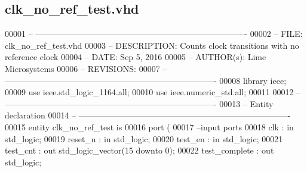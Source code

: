 \subsection{clk\+\_\+no\+\_\+ref\+\_\+test.\+vhd}
\label{clk__no__ref__test_8vhd_source}

\begin{DoxyCode}
00001 \textcolor{keyword}{-- ---------------------------------------------------------------------------- }
00002 \textcolor{keyword}{-- FILE:    clk\_no\_ref\_test.vhd}
00003 \textcolor{keyword}{-- DESCRIPTION: Counts clock transitions with no reference clock}
00004 \textcolor{keyword}{-- DATE:    Sep 5, 2016}
00005 \textcolor{keyword}{-- AUTHOR(s):   Lime Microsystems}
00006 \textcolor{keyword}{-- REVISIONS:}
00007 \textcolor{keyword}{-- ---------------------------------------------------------------------------- }
00008 \textcolor{vhdlkeyword}{library }\textcolor{keywordflow}{ieee};
00009 \textcolor{vhdlkeyword}{use }ieee.std\_logic\_1164.\textcolor{keywordflow}{all};
00010 \textcolor{vhdlkeyword}{use }ieee.numeric\_std.\textcolor{keywordflow}{all};
00011 
00012 \textcolor{keyword}{-- ----------------------------------------------------------------------------}
00013 \textcolor{keyword}{-- Entity declaration}
00014 \textcolor{keyword}{-- ----------------------------------------------------------------------------}
00015 \textcolor{keywordflow}{entity }clk_no_ref_test \textcolor{keywordflow}{is}
00016   \textcolor{keywordflow}{port} \textcolor{vhdlchar}{(}
00017 \textcolor{keyword}{        --input ports }
00018         \textcolor{vhdlchar}{clk}             \textcolor{vhdlchar}{:} \textcolor{keywordflow}{in} \textcolor{comment}{std\_logic};
00019         \textcolor{vhdlchar}{reset_n}         \textcolor{vhdlchar}{:} \textcolor{keywordflow}{in} \textcolor{comment}{std\_logic};
00020           \textcolor{vhdlchar}{test_en}           \textcolor{vhdlchar}{:} \textcolor{keywordflow}{in} \textcolor{comment}{std\_logic};
00021           \textcolor{vhdlchar}{test_cnt}          \textcolor{vhdlchar}{:} \textcolor{keywordflow}{out} \textcolor{comment}{std\_logic\_vector}\textcolor{vhdlchar}{(}\textcolor{vhdllogic}{}\textcolor{vhdllogic}{15} \textcolor{keywordflow}{downto} \textcolor{vhdllogic}{}\textcolor{vhdllogic}{0}\textcolor{vhdlchar}{)};
00022           \textcolor{vhdlchar}{test_complete} \textcolor{vhdlchar}{:} \textcolor{keywordflow}{out} \textcolor{comment}{std\_logic};

\end{DoxyCode}
